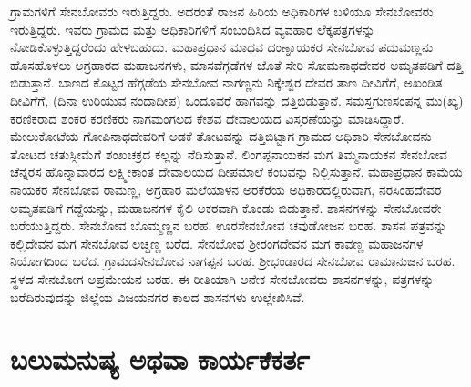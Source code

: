ಗ್ರಾಮಗಳಿಗೆ ಸೇನಬೋವರು ಇರುತ್ತಿದ್ದರು. ಅದರಂತೆ ರಾಜನ ಹಿರಿಯ ಅಧಿಕಾರಿಗಳ ಬಳಿಯೂ ಸೇನಬೋವರು ಇರುತ್ತಿದ್ದರು. ಇವರು ಗ್ರಾಮದ ಮತ್ತು ಅಧಿಕಾರಿಗಳಿಗೆ ಸಂಬಂಧಿಸಿದ ವ್ಯವಹಾರ ಲೆಕ್ಕಪತ್ರಗಳನ್ನು ನೋಡಿಕೊಳ್ಳುತ್ತಿದ್ದರೆಂದು ಹೇಳಬಹುದು. ಮಹಾಪ್ರಧಾನ ಮಾಧವ ದಂಣ್ನಾಯಕರ ಸೇನಬೋವ ಪದುಮಣ್ಣನು ಹೊಸಹೊಳಲು ಅಗ್ರಹಾರದ ಮಹಾಜನಗಳು, ಮಾಸವೆಗ್ಗಡೆಗಳ ಜೊತೆ ಸೇರಿ ಸೋಮನಾಥದೇವರ ಅಮೃತಪಡಿಗೆ ದತ್ತಿ ಬಿಡುತ್ತಾನೆ. ಬಾಣದ ಕೊಟ್ಟರ ಹೆಗ್ಗಡೆಯ ಸೇನಬೋವ ನಾಗಣ್ಣನು ನಿಕ್ಕೇಶ್ವರ ದೇವರ ತಾಣ ದೀವಿಗೆಗೆ, ಅಖಂಡಿತ ದೀವಿಗೆಗೆ, (ದಿನಾ ಉರಿಯುವ ನಂದಾದೀಪ) ಒಂದೂವರೆ ಹಾಗವನ್ನು ದತ್ತಿಬಿಡುತ್ತಾನೆ. ಸಮಸ್ತಗುಣಸಂಪನ್ನ ಮು(ಖ್ಯ) ಕರಣಿಕರಾದ ಶಂಕರ ಕರಣಿಕರು ನಾಗಮಂಗಲದ ಕೇಶವ ದೇವಾಲಯದ ವಿಸ್ತರಣೆಯನ್ನು ಮಾಡಿಸಿದ್ದಾರೆ. ಮೇಲುಕೋಟೆಯ ಗೋಪಿನಾಥದೇವರಿಗೆ ಅಡಕೆ ತೋಟವನ್ನು ದತ್ತಿಬಿಟ್ಟಾಗ ಗ್ರಾಮದ ಅಧಿಕಾರಿ ಸೇನಬೋವನು ತೋಟದ ಚತುಸ್ಸೀಮೆಗೆ ಶಂಖಚಕ್ರದ ಕಲ್ಲನ್ನು ನೆಡಿಸುತ್ತಾನೆ. ಲಿಂಗಪ್ಪನಾಯಕನ ಮಗ ತಿಮ್ಮನಾಯಕನ ಸೇನಬೋವ ಚೆನ್ನರಸ ಹೊನ್ನಾವಾರದ ಲಕ್ಷ್ಮೀಕಾಂತ ದೇವಾಲಯದ ದೀಪಮಾಲೆ ಕಂಬವನ್ನು ನಿಲ್ಲಿಸುತ್ತಾನೆ. ಮಹಾಪ್ರಧಾನ ಕಾಮೆಯ ನಾಯಕರ ಸೇನಬೋವ ರಾಮಣ್ಣ, ಅಗ್ರಹಾರ ಮಲೆಯಾಳನ ಅರಕೆರೆಯ ಅಧಿಕಾರದಲ್ಲಿರುವಾಗ, ನರಸಿಂಹದೇವರ ಅಮೃತಪಡಿಗೆ ಗದ್ದೆಯನ್ನು, ಮಹಾಜನಗಳ ಕೈಲಿ ಅಕರವಾಗಿ ಕೊಂಡು ಬಿಡುತ್ತಾನೆ. ಶಾಸನಗಳನ್ನು ಸೇನಬೋವರೇ ಬರೆಯುತ್ತಿದ್ದರು. ಸೇನಬೋವ ಬೊಮ್ಮಣ್ಣನ ಬರಹ. ಊರಸೇನಬೋವ ಚವುಡೋಜನ ಬರಹ. ಶಾಸನ ಪತ್ರವನ್ನು ಕಲ್ಲಿದೇವನ ಮಗ ಸೇನಬೋವ ಲಚ್ಚಣ್ಣ ಬರೆದ. ಸೇನಬೋವ ಶ‍್ರೀರಂಗದೇವನ ಮಗ ಕಾವಣ್ಣ ಮಹಾಜನಗಳ ನಿಯೋಗದಿಂದ ಬರೆದ. ಗ್ರಾಮದಸೇನಬೋವ ನಾಗಪ್ಪನ ಬರಹ. ಶ‍್ರೀಭಂಡಾರದ ಸೇನಬೋವ ರಾಮಾನುಜನ ಬರಹ. ಸ್ಥಳದ ಸೇನಬೋಗ ಅಪ್ರಮೇಯನ ಬರಹ. ಈ ರೀತಿ\-ಯಾಗಿ ಅನೇಕ ಸೇನಬೋವರು ಶಾಸನಗಳನ್ನು, ಪತ್ರಗಳನ್ನು ಬರೆದಿರುವುದನ್ನು ಜಿಲ್ಲೆಯ ವಿಜಯನಗರ ಕಾಲದ ಶಾಸನಗಳು ಉಲ್ಲೇಖಿಸಿವೆ.

\section{ಬಲುಮನುಷ್ಯ ಅಥವಾ ಕಾರ್ಯಕೆಕರ್ತ}

